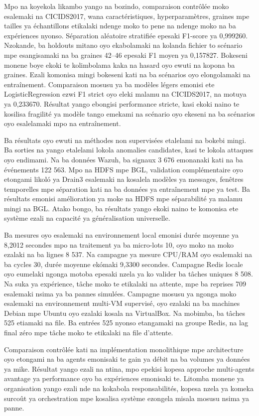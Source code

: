 \documentclass[12pt,a4paper,oneside]{report}
\begin{document}
Mpo na koyekola likambo yango na bozindo, comparaison contrôlée moko esalemaki na CICIDS2017, wana caractéristiques, hyperparamètres, graines mpe tailles ya échantillons etikalaki ndenge moko to pene na ndenge moko na ba expériences nyonso. Séparation aléatoire stratifiée epesaki F1-score ya 0,999260. Nzokande, ba holdouts mitano oyo ekabolamaki na kolanda fichier to scénario mpe esangisamaki na ba graines 42--46 epesaki F1 moyen ya 0,157827. Bokeseni monene boye ekoki te kolimbolama kaka na hasard oyo ewuti na kopona ba graines. Ezali komonisa mingi bokeseni kati na ba scénarios oyo elongolamaki na entraînement. Comparaison mosusu ya ba modèles légers emonisi ete LogisticRegression ezwi F1 strict oyo eleki malamu na CICIDS2017, na motuya ya 0,233670. Résultat yango ebongisi performance stricte, kasi ekoki naino te kosilisa fragilité ya modèle tango emekami na scénario oyo ekeseni na ba scénarios oyo esalelamaki mpo na entraînement.

Ba résultats oyo ewuti na méthodes non supervisées etalelami na bokebi mingi. Ba sorties na yango etalelami lokola anomalies candidates, kasi te lokola attaques oyo endimami. Na ba données Wazuh, ba signaux 3 676 emonanaki kati na ba événements 122 563. Mpo na HDFS mpe BGL, validation complémentaire oyo etongami likoló ya Drain3 esalemaki na kosalela modèles ya messages, fenêtres temporelles mpe séparation kati na ba données ya entraînement mpe ya test. Ba résultats emonisi amélioration ya moke na HDFS mpe séparabilité ya malamu mingi na BGL. Atako bongo, ba résultats yango ekoki naino te komonisa ete système ezali na capacité ya généralisation universelle.

Ba mesures oyo esalemaki na environnement local emonisi durée moyenne ya 8,2012 secondes mpo na traitement ya ba micro-lots 10, oyo moko na moko ezalaki na ba lignes 8 537. Na campagne ya mesure CPU/RAM oyo esalemaki na ba cycles 30, durée moyenne ekómaki 9,3300 secondes. Campagne Redis locale oyo eumelaki ngonga motoba epesaki nzela ya ko valider ba tâches uniques 8 508. Na suka ya expérience, tâche moko te etikalaki na attente, mpe ba reprises 709 esalemaki nsima ya ba pannes simulées. Campagne mosusu ya ngonga moko esalemaki na environnement multi-VM supervisé, oyo ezalaki na ba machines Debian mpe Ubuntu oyo ezalaki kosala na VirtualBox. Na mobimba, ba tâches 525 etiamaki na file. Ba entrées 525 nyonso etangamaki na groupe Redis, na lag final zéro mpe tâche moko te etikalaki na file d'attente.

Comparaison contrôlée kati na implémentation monolithique mpe architecture oyo etongami na ba agents emonisaki te gain ya débit na ba volumes ya données ya mike. Résultat yango ezali na ntina, mpo epekisi kopesa approche multi-agents avantage ya performance oyo ba expériences emonisaki te. Litomba monene ya organisation yango ezali nde na kokabola responsabilités, kopesa nzela ya komeka surcoût ya orchestration mpe kosalisa système ezongela misala mosusu nsima ya panne.
\end{document}
